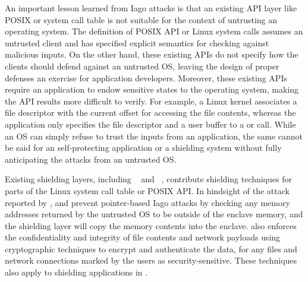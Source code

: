 An important lesson learned from Iago attacks
is that 
an existing API layer like POSIX or system call table is not suitable for the context of untrusting an operating system.
The definition of POSIX API or Linux system calls assumes an untrusted client
and has specified explicit semantics for checking against malicious inputs.
On the other hand,
these existing APIs do not specify
how the clients should defend against an untrusted OS,
leaving the design of proper defenses
an exercise for application developers.
Moreover,
these existing APIs require an application
to endow sensitive states
to the operating system, making the API results more difficult to verify. For example,
a Linux kernel associates a file descriptor
with the current offset for accessing the file contents, whereas the application
only specifies the file descriptor and a user buffer to a  or  call.
While an OS can simply refuse to trust the inputs from an application,
the same cannot be said for an self-protecting application or a shielding system
without fully anticipating
the attacks from an untrusted OS.










Existing shielding layers, including \scone{}~\cite{osdi16scone} and \panoply{}~\cite{shinde17panoply},
contribute shielding techniques for parts of the Linux system call table
or POSIX API.
In hindsight of the  attack reported by \citet{checkoway13iago},
\scone{} and \panoply{} prevent
pointer-based Iago attacks by checking any memory addresses returned by the untrusted OS to be outside of the enclave memory,
and the shielding layer will copy the memory contents into the enclave.
\scone{} also
enforces the confidentiality and integrity
of file contents and network payloads
using cryptographic techniques to encrypt and authenticate the data,
for any files and network connections
marked by the users as security-sensitive. 
These techniques also apply to shielding applications in \graphenesgx{}.



